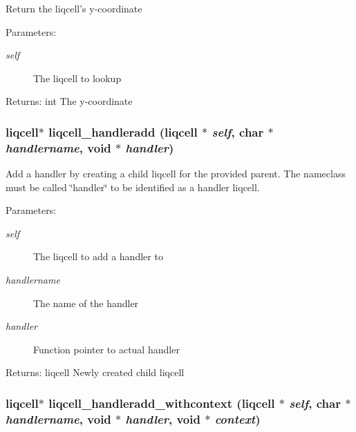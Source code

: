 Return the liqcell's y-coordinate \begin{Desc}
\item[Parameters:]
\begin{description}
\item[{\em self}]The liqcell to lookup \end{description}
\end{Desc}
\begin{Desc}
\item[Returns:]int The y-coordinate \end{Desc}
\subsubsection[{liqcell\_\-handleradd}]{\setlength{\rightskip}{0pt plus 5cm}liqcell$\ast$ liqcell\_\-handleradd (liqcell $\ast$ {\em self}, \/  char $\ast$ {\em handlername}, \/  void $\ast$ {\em handler})}\label{d5/da2/liqcell_8c_b2045008c4c69ad93f43b04e6b87f6ea}


Add a handler by creating a child liqcell for the provided parent. The nameclass must be called \char`\"{}handler\char`\"{} to be identified as a handler liqcell.

\begin{Desc}
\item[Parameters:]
\begin{description}
\item[{\em self}]The liqcell to add a handler to \item[{\em handlername}]The name of the handler \item[{\em handler}]Function pointer to actual handler \end{description}
\end{Desc}
\begin{Desc}
\item[Returns:]liqcell Newly created child liqcell \end{Desc}
\subsubsection[{liqcell\_\-handleradd\_\-withcontext}]{\setlength{\rightskip}{0pt plus 5cm}liqcell$\ast$ liqcell\_\-handleradd\_\-withcontext (liqcell $\ast$ {\em self}, \/  char $\ast$ {\em handlername}, \/  void $\ast$ {\em handler}, \/  void $\ast$ {\em context})}\label{d5/da2/liqcell_8c_d0a4310293fbd69cf93b3795970ae999}



